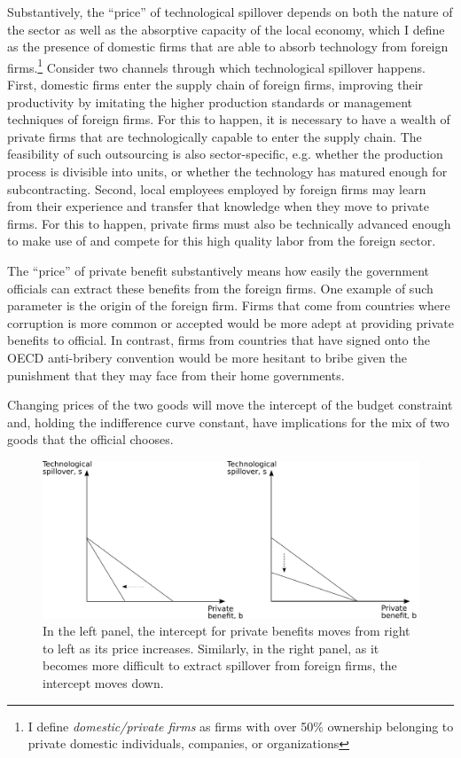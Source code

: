 Substantively, the ``price'' of technological spillover depends on both the nature of the sector as well as the absorptive capacity of the local economy, which I define as the presence of domestic firms that are able to absorb technology from foreign firms.\footnote{I define \textit{domestic/private firms} as firms with over 50\% ownership belonging to private domestic individuals, companies, or organizations} Consider two channels through which technological spillover happens. First, domestic firms enter the supply chain of foreign firms, improving their productivity by imitating the higher production standards or management techniques of foreign firms. For this to happen, it is necessary to have a wealth of private firms that are technologically capable to enter the supply chain. The feasibility of such outsourcing is also sector-specific, e.g. whether the production process is divisible into units, or whether the technology has matured enough for subcontracting. Second, local employees employed by foreign firms may learn from their experience and transfer that knowledge when they move to private firms. For this to happen, private firms must also be technically advanced enough to make use of and compete for this high quality labor from the foreign sector.

The ``price'' of private benefit substantively means how easily the government officials can extract these benefits from the foreign firms. One example of such parameter is the origin of the foreign firm. Firms that come from countries where corruption is more common or accepted would be more adept at providing private benefits to official. In contrast, firms from countries that have signed onto the OECD anti-bribery convention would be more hesitant to bribe given the punishment that they may face from their home governments.

Changing prices of the two goods will move the intercept of the budget constraint and, holding the indifference curve constant, have implications for the mix of two goods that the official chooses.

\begin{figure}[!ht]
	\centering
    \includegraphics[width=\textwidth, height=\textheight,keepaspectratio]{../figure/absorptive_capacity}
    \caption{In the left panel, the intercept for private benefits moves from right to left as its price increases. Similarly, in the right panel, as it becomes more difficult to extract spillover from foreign firms, the intercept moves down.}
    \label{fig:relative_price}
\end{figure}

